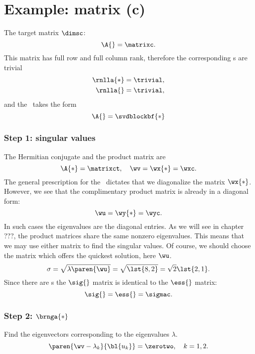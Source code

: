 \section{Example: matrix (c)}
\label{sec:svd:c}
The target matrix $\dimsc$:
\begin{equation}
  \A{} = \matrixc.
\end{equation}
This matrix has full row and full column rank, therefore the corresponding \ns s are trivial
\begin{equation}
  \begin{split}
    \rnlla{*} &= \trivial, \\
    \rnlla{ } &= \trivial,
  \end{split}
\end{equation}
and the \asvd \ takes the form
\begin{equation}
  \A{} = \svdblockbf{*}
\end{equation}


\subsubsection{Step 1: singular values}
The Hermitian conjugate and the product matrix are
\begin{equation}
  \A{*} = \matrixct, \quad \wv = \wx{*} = \wxc.
\end{equation}
The general prescription for the \asvd \ dictates that we diagonalize the matrix $\wx{*}$. However, we see that the complimentary product matrix is already in a diagonal form:
\begin{equation}
  \wu = \wy{*} = \wyc.
\end{equation}
In such cases the eigenvalues are the diagonal entries.
As we will see in chapter ???, the product matrices share the same nonzero eigenvalues. This means that we may use either matrix to find the singular values. Of course, we should choose the matrix which offers the quickest solution, here $\wu$.
\begin{equation}
  \sigma = \sqrt{\lambda\paren{\wu}} = \sqrt{\lst{8,2}} = \sqrt{2}\lst{2, 1}.
\end{equation}
Since there are \ns s the $\sig{}$ matrix is identical to the $\ess{}$ matrix:
\begin{equation}
  \sig{} = \ess{} = \sigmac.
\end{equation}



\subsubsection{Step 2: $\brnga{*}$}
Find the eigenvectors corresponding to the eigenvalues $\lambda$.
\begin{equation*}
  \paren{\wv - \lambda_{k}} {\bl{ u_{k} }} = \zerotwo, \quad k=1,2.
\end{equation*}
%

